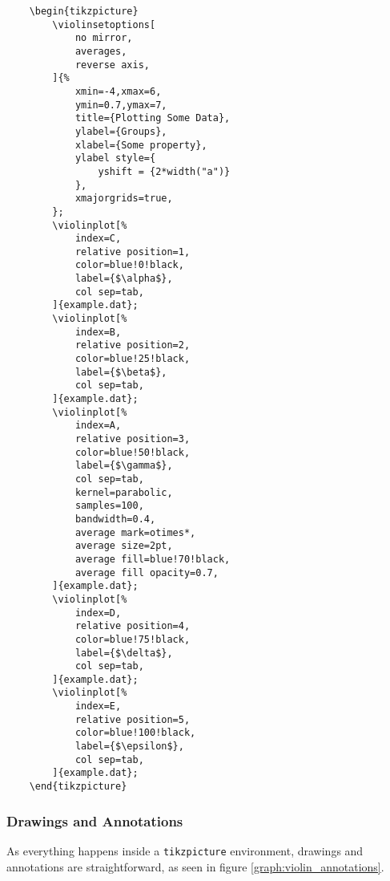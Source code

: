 \documentclass{article}
\begin{document}
\begin{verbatim}
	\begin{tikzpicture}
		\violinsetoptions[
			no mirror,
			averages,
			reverse axis,
		]{%
			xmin=-4,xmax=6,
			ymin=0.7,ymax=7,
			title={Plotting Some Data},
			ylabel={Groups},
			xlabel={Some property},
			ylabel style={
				yshift = {2*width("a")}
			},
			xmajorgrids=true,
		};
		\violinplot[%
			index=C,
			relative position=1,
			color=blue!0!black,
			label={$\alpha$},
			col sep=tab,
		]{example.dat};
		\violinplot[%
			index=B,
			relative position=2,
			color=blue!25!black,
			label={$\beta$},
			col sep=tab,
		]{example.dat};
		\violinplot[%
			index=A,
			relative position=3,
			color=blue!50!black,
			label={$\gamma$},
			col sep=tab,
			kernel=parabolic,
			samples=100,
			bandwidth=0.4,
			average mark=otimes*,
			average size=2pt,
			average fill=blue!70!black,
			average fill opacity=0.7,
		]{example.dat};
		\violinplot[%
			index=D,
			relative position=4,
			color=blue!75!black,
			label={$\delta$},
			col sep=tab,
		]{example.dat};
		\violinplot[%
			index=E,
			relative position=5,
			color=blue!100!black,
			label={$\epsilon$},
			col sep=tab,
		]{example.dat};
	\end{tikzpicture}
\end{verbatim}

\subsubsection{Drawings and Annotations}

As everything happens inside a \texttt{tikzpicture} environment, drawings
and annotations are straightforward, as seen in figure \ref{graph:violin_annotations}.
\end{document}
